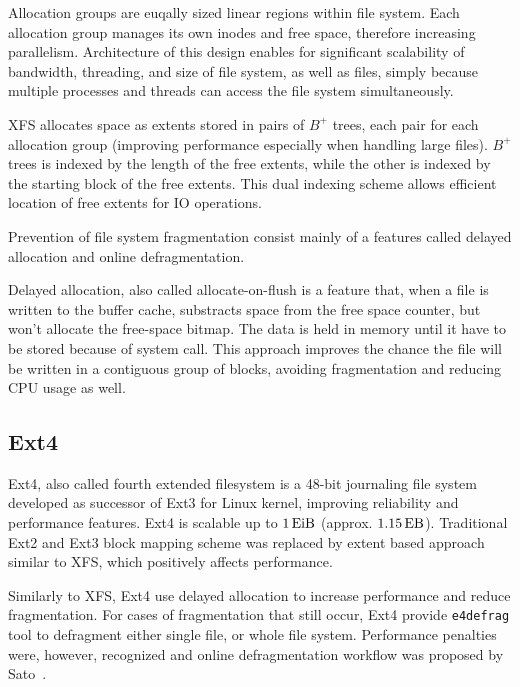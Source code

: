 \documentclass[
  color, %
  table, %
  lof,   %
  lot,   %
]{fithesis3}
\begin{document}
Allocation groups are euqally sized linear regions within file system. Each allocation group manages its own inodes and free space, therefore increasing parallelism. Architecture of this design enables for significant scalability of bandwidth, threading, and size of file system, as well as files, simply because multiple processes and threads can access the file system simultaneously.

XFS allocates space as extents stored in pairs of $B^+$ trees, each pair for each allocation group (improving performance especially when handling large files). $B^+$ trees is indexed by the length of the free extents, while the other is indexed by the starting block of the free extents. This dual indexing scheme allows efficient location of free extents for IO operations.

Prevention of file system fragmentation consist mainly of a features called delayed allocation and online defragmentation.

Delayed allocation, also called allocate-on-flush is a feature that, when a file is written to the buffer cache, substracts space from the free space counter, but won't allocate the free-space bitmap. The data is held in memory until it have to be stored because of system call. This approach improves the chance the file will be written in a contiguous group of blocks, avoiding fragmentation and reducing CPU usage as well.

\subsection{Ext4}
Ext4, also called fourth extended filesystem is a 48-bit journaling file system developed as successor of Ext3 for Linux kernel, improving reliability and performance features. Ext4 is scalable up to $\SI{1}{\exbi\byte}$ (approx. $\SI{1.15}{\exa\byte}$). Traditional Ext2 and Ext3 block mapping scheme was replaced by extent based approach similar to XFS, which positively affects performance.

Similarly to XFS, Ext4 use delayed allocation to increase performance and reduce fragmentation. For cases of fragmentation that still occur, Ext4 provide \texttt{e4defrag} tool to defragment either single file, or whole file system. Performance penalties were, however, recognized and online defragmentation workflow was proposed by Sato~\cite{sato2007:ext4}.


\end{document}
